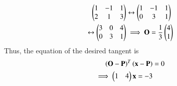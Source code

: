\documentclass[journal,12pt,twocolumn]{IEEEtran}
\begin{document}
\begin{enumerate}[label=\arabic*]
\begin{align}
\begin{pmatrix}1 & -1 & 1\\2 & 1 & 3\end{pmatrix}&\leftrightarrow\begin{pmatrix}1 & -1 & 1\\0 & 3 & 1\end{pmatrix}
\nonumber \\
\leftrightarrow\begin{pmatrix}3 & 0 & 4\\0 & 3 & 1\end{pmatrix}&\implies \mathbf{O} = \frac{1}{3}\begin{pmatrix}4 \\ 1\end{pmatrix}
\end{align} 
%
Thus, the equation of the desired tangent is 
\begin{align} 
\left(\mathbf{O}-\mathbf{P}\right)^T\left(\mathbf{x}-\mathbf{P}\right) &= 0
\nonumber \\
\implies
\begin{pmatrix}1 & 4\end{pmatrix}\mathbf{x}=-3
\end{align} 
\end{enumerate}
\end{document}
